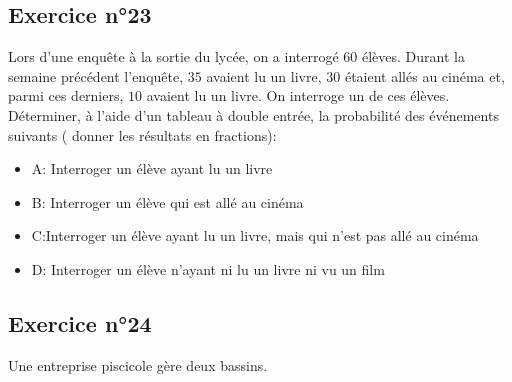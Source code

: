 \documentclass[12pt,a4paper]{article}
\begin{document}
\begin{center}
\end{center}

\subsection*{Exercice n°23}

Lors d'une enquête à la sortie du lycée, on a interrogé $60$ élèves. Durant la semaine précédent l'enquête, $35$ avaient lu un livre, $30$ étaient allés au cinéma et, parmi ces derniers, $10$ avaient lu un livre. On interroge un de ces élèves. Déterminer, à l'aide d'un tableau à double entrée, la probabilité des événements suivants ( donner les résultats en fractions):

\begin{itemize}
    \item A: \og Interroger un élève ayant lu un livre\fg
    \item B: \og Interroger un élève qui est allé au cinéma \fg{}
    \item C:\og Interroger un élève ayant lu un livre, mais qui n'est pas allé au cinéma
    \item D: \og Interroger un élève n'ayant ni lu un livre ni vu un film \fg
\end{itemize}

\subsection*{Exercice n°24}

Une entreprise piscicole gère deux bassins.\\
\end{document}
